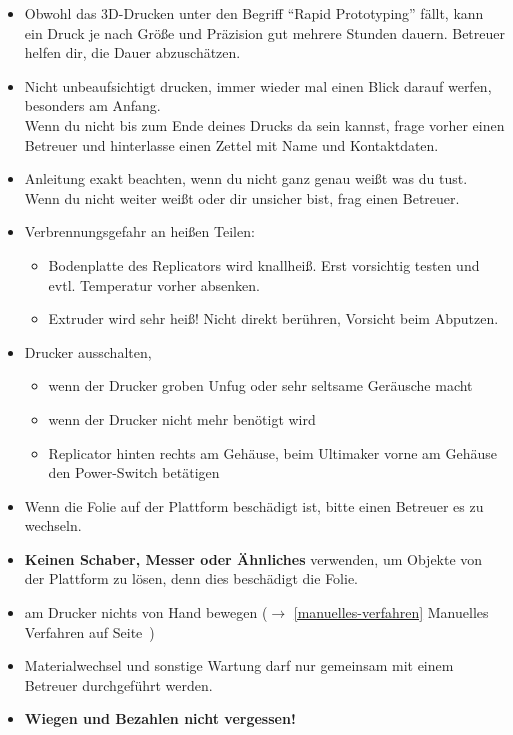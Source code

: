 \documentclass{\basedir/fablab-document}
\begin{document}
\begin{itemize}
 \item Obwohl das 3D-Drucken unter den Begriff ``Rapid Prototyping'' fällt, kann ein Druck je nach Größe und 
 Präzision gut mehrere Stunden dauern. Betreuer helfen dir, die Dauer abzuschätzen. 
 \item Nicht unbeaufsichtigt drucken, immer wieder mal einen Blick darauf werfen, besonders am Anfang.\\
Wenn du nicht bis zum Ende deines Drucks da sein kannst, frage vorher einen Betreuer und hinterlasse einen Zettel mit Name und Kontaktdaten.
 \item Anleitung exakt beachten, wenn du nicht ganz genau weißt was du tust.\\
Wenn du nicht weiter weißt oder dir unsicher bist, frag einen Betreuer.
 \item Verbrennungsgefahr an heißen Teilen:
  \begin{itemize}
   \item Bodenplatte des Replicators wird knallheiß. Erst vorsichtig testen und evtl. Temperatur vorher absenken.
   \item Extruder wird sehr heiß! Nicht direkt berühren, Vorsicht beim Abputzen.
  \end{itemize}
 \item Drucker ausschalten,
 \begin{itemize}
  \item wenn der Drucker groben Unfug oder sehr seltsame Geräusche macht
  \item wenn der Drucker nicht mehr benötigt wird
  \item Replicator hinten rechts am Gehäuse, beim Ultimaker vorne am Gehäuse den Power-Switch betätigen
 \end{itemize}
 \item Wenn die Folie auf der Plattform beschädigt ist, bitte einen Betreuer es zu wechseln.
 \item \textbf{Keinen Schaber, Messer oder Ähnliches} verwenden, um Objekte von der Plattform zu lösen, denn dies beschädigt die Folie.
 \item am Drucker nichts von Hand bewegen ($\to$ \ref{manuelles-verfahren} Manuelles Verfahren auf Seite\, \pageref{manuelles-verfahren})
 \item Materialwechsel und sonstige Wartung darf nur gemeinsam mit einem Betreuer durchgeführt werden.
 \item \textbf{Wiegen und Bezahlen nicht vergessen!}
\end{itemize}
\newpage
\renewcommand{\contentsname}{Inhaltsverzeichnis / Arbeitsablauf}
\setcounter{tocdepth}{2}
\tableofcontents
\end{document}
